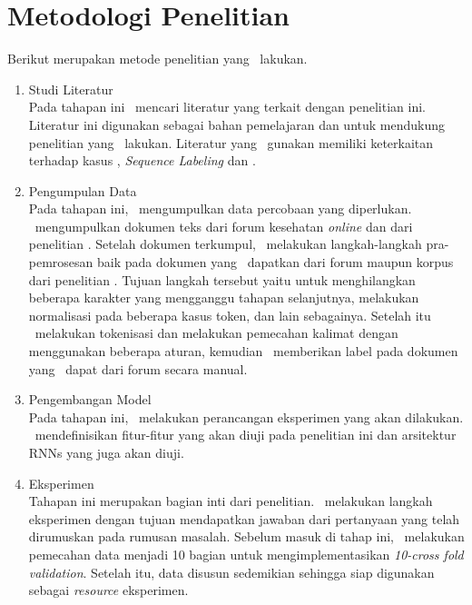\section{Metodologi Penelitian}
Berikut merupakan metode penelitian yang \saya~lakukan.
\begin{enumerate}
	\item Studi Literatur\\
	Pada tahapan ini \saya~mencari literatur yang terkait dengan penelitian ini. Literatur ini digunakan sebagai bahan pemelajaran dan untuk mendukung penelitian yang \saya~lakukan. Literatur yang \saya~gunakan memiliki keterkaitan terhadap kasus \mer, \textit{Sequence Labeling} dan \rnn.
	
	\item Pengumpulan Data \\
	Pada tahapan ini, \saya~mengumpulkan data percobaan yang diperlukan. \Saya~mengumpulkan dokumen teks dari forum kesehatan \textit{online} dan dari penelitian \cite{skripsiKakRadit}. Setelah dokumen terkumpul, \saya~melakukan langkah-langkah pra-pemrosesan baik pada dokumen yang \saya~dapatkan dari forum maupun korpus dari penelitian \cite{skripsiKakRadit}. Tujuan langkah tersebut yaitu untuk menghilangkan beberapa karakter yang mengganggu tahapan selanjutnya, melakukan normalisasi pada beberapa kasus token, dan lain sebagainya. Setelah itu \saya~melakukan tokenisasi dan melakukan pemecahan kalimat dengan menggunakan beberapa aturan, kemudian \saya~memberikan label pada dokumen yang \saya~dapat dari forum secara manual. 
	
	\item Pengembangan Model\\
	Pada tahapan ini, \saya~melakukan perancangan eksperimen yang akan dilakukan. \Saya~mendefinisikan fitur-fitur yang akan diuji pada penelitian ini dan arsitektur RNNs yang juga akan diuji.
		
	\item Eksperimen \\
	Tahapan ini merupakan bagian inti dari penelitian. \saya~melakukan langkah eksperimen dengan tujuan mendapatkan jawaban dari pertanyaan yang telah dirumuskan pada rumusan masalah. Sebelum masuk di tahap ini, \saya~melakukan pemecahan data menjadi 10 bagian untuk mengimplementasikan \textit{10-cross fold validation}. Setelah itu, data disusun sedemikian sehingga siap digunakan sebagai \textit{resource} eksperimen.
	

\end{enumerate}
